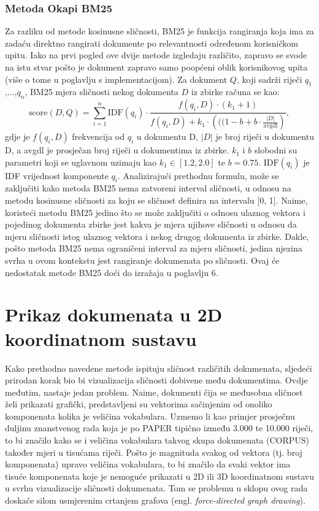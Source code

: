 \documentclass[times, utf8, zavrsni]{fer}
\begin{document}
\subsection{Metoda Okapi BM25}
Za razliku od metode kosinusne sličnosti, BM25 je funkcija rangiranja koja ima za zadaću direktno rangirati dokumente po relevantnosti određenom korisničkom upitu. Iako na prvi pogled ove dvije metode izgledaju različito, zapravo se svode na istu stvar pošto je dokument zapravo samo poopćeni oblik korisnikovog upita (više o tome u poglavlju s implementacijom).
Za dokument $Q$, koji sadrži riječi $q_{1}$,...,$q_{n}$, BM25 mjera sličnosti nekog dokumenta $D$ iz zbirke računa se kao:
\begin{equation}
{\displaystyle {\text{score}}(D,Q)=\sum _{i=1}^{n}{\text{IDF}}(q_{i})\cdot {\frac {f(q_{i},D)\cdot (k_{1}+1)}{f(q_{i},D)+k_{1}\cdot \left(((1-b+b\cdot {\frac {|D|}{\text{avgdl}}}\right)}},}
\end{equation}
gdje je ${\displaystyle f(q_{i},D)}$	 frekvencija od ${\displaystyle q_{i}}$ u dokumentu D, ${\displaystyle |D|}$ je broj riječi u dokumentu D, a avgdl je prosječan broj riječi u dokumentima iz zbirke. ${\displaystyle k_{1}}$ i $b$ slobodni su parametri koji se uglavnom uzimaju kao ${\displaystyle k_{1}\in [1.2,2.0]}$ te ${\displaystyle b=0.75}.{\displaystyle {\text{ IDF}}(q_{i})}$ je IDF vrijednost komponente ${\displaystyle q_{i}}$.
Analizirajući prethodnu formulu, može se zaključiti kako metoda BM25 nema zatvoreni interval sličnosti, u odnosu na metodu kosinusne sličnosti za koju se sličnost definira na intervalu [0, 1]. Naime, koristeći metodu BM25 jedino što se može zaključiti o odnosu ulaznog vektora i pojedinog dokumenta zbirke jest kakva je mjera njihove sličnosti u odnosu da mjeru sličnosti istog ulaznog vektora i nekog drugog dokumenta iz zbirke. Dakle, pošto metoda BM25 nema ograničeni interval za mjeru sličnosti, jedina njezina svrha u ovom kontekstu jest rangiranje dokumenata po sličnosti. Ovaj će nedostatak metode BM25 doći do izražaja u poglavlju 6.

\chapter{Prikaz dokumenata u 2D koordinatnom sustavu}
Kako prethodno navedene metode ispituju sličnost različitih dokumenata, sljedeći prirodan korak bio bi vizualizacija  sličnosti dobivene među dokumentima. Ovdje međutim, nastaje jedan problem. Naime, dokumenti čija se međusobna sličnost želi prikazati grafički, predstavljeni su vektorima sačinjenim od onoliko komponenata kolika je veličina vokabulara. Uzmemo li kao primjer prosječnu duljinu znanstvenog rada koja je po PAPER tipično između 3.000 te 10.000 riječi, to bi značilo kako se i veličina vokabulara takvog skupa dokumenata (CORPUS) također mjeri u tisućama riječi. Pošto je magnituda svakog od vektora (tj. broj komponenata) upravo veličina vokabulara, to bi značilo da svaki vektor ima tisuće komponenata koje je nemoguće prikazati u 2D ili 3D koordinatnom sustavu u svrhu vizualizacije sličnosti dokumenata. Tom se problemu u sklopu ovog rada doskače silom usmjerenim crtanjem grafova (engl. \textit{force-directed graph drawing}).
\end{document}

